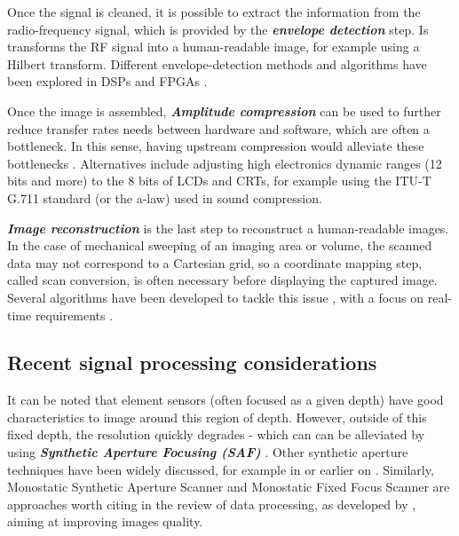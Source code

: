 \documentclass{article}
\begin{document}
Once the signal is cleaned, it is possible to extract the information from the radio-frequency signal, which is provided by the \textbf{\textit{envelope detection}} step. Is transforms the RF signal into a human-readable image, for example using a Hilbert transform. Different envelope-detection methods and algorithms have been explored in DSPs and FPGAs \cite{chang_novel_2007, assef_fpga_2019, assef_modeling_2018}.

Once the image is assembled, \textbf{\textit{Amplitude compression}} can be used to further reduce  transfer rates needs between hardware and software, which are often a bottleneck. In this sense, having upstream compression would alleviate these bottlenecks \cite{soto-cajiga_fpga-based_2012, akkala_fpga_2014}. Alternatives \cite{akkala_compression_2014, boonleelakul_compression_2013} include  adjusting high electronics dynamic ranges (12 bits and more) to the 8 bits of LCDs and CRTs, for example using the ITU-T G.711 standard (or the a-law) used in sound compression.

\textbf{\textit{Image reconstruction}} is the last step to reconstruct a human-readable images. In the case of mechanical sweeping of an imaging area or volume, the scanned data may not correspond to a Cartesian grid, so a coordinate mapping step, called scan conversion, is often necessary before displaying the captured image.
Several algorithms have been developed to tackle this issue \cite{ophir_digital_1979}, with a focus on real-time requirements \cite{csany_real-time_2019}.

\subsection{Recent signal processing considerations}



It can be noted that element sensors (often focused as a given depth) have good characteristics to image around this region of depth. However, outside of this fixed depth, the resolution quickly degrades - which can can be alleviated by using \textbf{\textit{Synthetic Aperture Focusing (SAF)}}  \cite{andresen_synthetic_2011, assef_flexible_2015, li_initial_2018, lewandowski_low-cost_2012, zhang_synthetic_2016}. Other synthetic aperture techniques have been widely discussed, for example in \cite{gunarathne_strategies_2013, jeon_novel_2019} or earlier on \cite{burckhardt_experimental_1974}. Similarly, Monostatic Synthetic Aperture Scanner and Monostatic Fixed Focus Scanner are approaches worth citing in the review of data processing, as developed by \cite{bottenus_implementation_2015, ylitalo_ultrasound_1994,heuvel_development_2017, nikolov_fast_2008}, aiming at improving images quality.  
\end{document}
